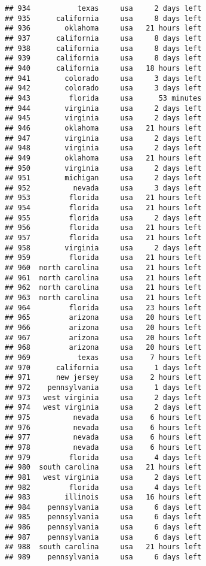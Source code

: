 \documentclass[
]{article}
\begin{document}
\begin{verbatim}
## 934           texas     usa     2 days left
## 935      california     usa     8 days left
## 936        oklahoma     usa   21 hours left
## 937      california     usa     8 days left
## 938      california     usa     8 days left
## 939      california     usa     8 days left
## 940      california     usa   18 hours left
## 941        colorado     usa     3 days left
## 942        colorado     usa     3 days left
## 943         florida     usa      53 minutes
## 944        virginia     usa     2 days left
## 945        virginia     usa     2 days left
## 946        oklahoma     usa   21 hours left
## 947        virginia     usa     2 days left
## 948        virginia     usa     2 days left
## 949        oklahoma     usa   21 hours left
## 950        virginia     usa     2 days left
## 951        michigan     usa     2 days left
## 952          nevada     usa     3 days left
## 953         florida     usa   21 hours left
## 954         florida     usa   21 hours left
## 955         florida     usa     2 days left
## 956         florida     usa   21 hours left
## 957         florida     usa   21 hours left
## 958        virginia     usa     2 days left
## 959         florida     usa   21 hours left
## 960  north carolina     usa   21 hours left
## 961  north carolina     usa   21 hours left
## 962  north carolina     usa   21 hours left
## 963  north carolina     usa   21 hours left
## 964         florida     usa   23 hours left
## 965         arizona     usa   20 hours left
## 966         arizona     usa   20 hours left
## 967         arizona     usa   20 hours left
## 968         arizona     usa   20 hours left
## 969           texas     usa    7 hours left
## 970      california     usa     1 days left
## 971      new jersey     usa    2 hours left
## 972    pennsylvania     usa     1 days left
## 973   west virginia     usa     2 days left
## 974   west virginia     usa     2 days left
## 975          nevada     usa    6 hours left
## 976          nevada     usa    6 hours left
## 977          nevada     usa    6 hours left
## 978          nevada     usa    6 hours left
## 979         florida     usa     4 days left
## 980  south carolina     usa   21 hours left
## 981   west virginia     usa     2 days left
## 982         florida     usa     4 days left
## 983        illinois     usa   16 hours left
## 984    pennsylvania     usa     6 days left
## 985    pennsylvania     usa     6 days left
## 986    pennsylvania     usa     6 days left
## 987    pennsylvania     usa     6 days left
## 988  south carolina     usa   21 hours left
## 989    pennsylvania     usa     6 days left

\end{verbatim}
\end{document}
